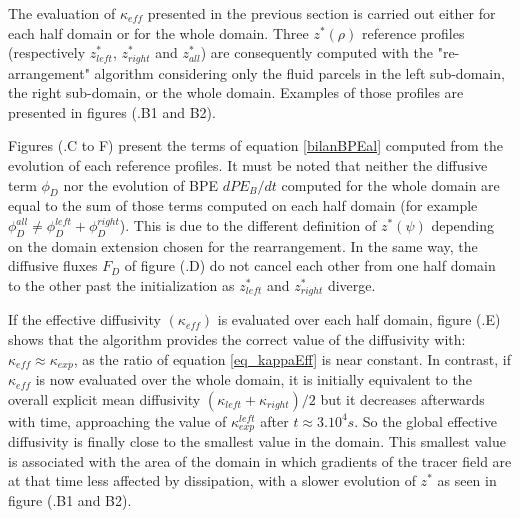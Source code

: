 The evaluation of $\kappa_{eff}$ presented in the previous section is carried out either for each half domain or for the whole domain. Three $z^*(\rho)$ reference profiles (respectively $z^*_{left}$, $z^*_{right}$ and $z^*_{all}$) are consequently computed with the "re-arrangement" algorithm considering only the fluid parcels in the left sub-domain, the right sub-domain, or the whole domain. Examples of those profiles are presented in figures (.B1 and B2).

Figures (.C to F) present the terms of equation \ref{bilanBPEal} computed from the evolution of each reference profiles. It must be noted that neither the diffusive term $\phi_D$ nor the evolution of BPE $dPE_B/dt$ computed for the whole domain are equal to the sum of those terms computed on each half domain (for example $\phi_D^{all} \ne \phi_D^{left}+\phi_D^{right}$). This is due to the different definition of $z^*(\psi)$ depending on the domain extension chosen for the rearrangement. In the same way, the diffusive fluxes $F_D$ of figure (.D) do not cancel each other from one half domain to the other past the initialization as $z^*_{left}$ and $z^*_{right}$ diverge.

If the effective diffusivity $(\kappa_{eff})$ is evaluated over each half domain, figure (.E) shows that the algorithm provides the correct value of the diffusivity with: $\kappa_{eff}\approx\kappa_{exp}$, as the ratio of equation \ref{eq_kappaEff} is near constant. In contrast, if $\kappa_{eff}$ is now evaluated over the whole domain, it is initially equivalent to the overall explicit mean diffusivity $(\kappa_{left}+\kappa_{right})/2$ but it decreases afterwards with time, approaching the value of $\kappa_{exp}^{left}$ after $t \approx 3.10^4s$. So the global effective diffusivity is finally close to the smallest value in the domain. This smallest value is associated with the area of the domain in which gradients of the tracer field are at that time less affected by dissipation, with a slower evolution of $z^*$ as seen in figure (.B1 and B2).

